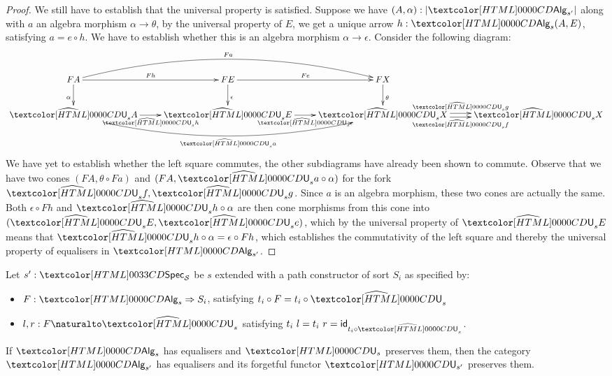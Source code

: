 \begin{proof}
  We still have to establish that the universal property is
  satisfied. Suppose we have $(A, \alpha) : | \Alg_{s'} |$ along with
  $a$ an algebra morphism $\alpha \to \theta$, by the universal
  property of $E$, we get a unique arrow $h : \Alg_s(A,E)$, satisfying
  $a = e \circ h$. We have to establish whether this is an algebra
  morphism $\alpha \to \epsilon$. Consider the following diagram:
  $$
  \xymatrix{
    FA
    \ar[r]^{Fh}
    \ar[d]_{\alpha}
    \ar@/^2pc/[rr]^{Fa}
    &FE 
    \ar[r]^{Fe}
    \ar[d]^{\epsilon}
    &FX
    \ar[d]^{\theta}
    \\
    \extendfunc{\Und}_s A
    \ar[r]_{\extendfunc{\Und}_s h}
    \ar@/_2pc/[rr]_{\extendfunc{\Und}_s a}
    &\extendfunc{\Und}_s E
    \ar[r]_{\extendfunc{\Und}_s e}
    &\extendfunc{\Und}_s X
    \ar@<-.5ex>[r]_-{\extendfunc{\Und}_s f} \ar@<.5ex>[r]^-{\extendfunc{\Und}_s g}
    &\extendfunc{\Und}_s X
  }
  $$
  We have yet to establish whether the left square commutes, the other
  subdiagrams have already been shown to commute. Observe that we have
  two cones $(FA, \theta \circ Fa)$ and $(FA, \extendfunc{\Und}_s a \circ \alpha)$ for
  the fork $\extendfunc{\Und}_s f, \extendfunc{\Und}_s g$. Since $a$ is an algebra morphism, these two cones
  are actually the same. Both $\epsilon \circ Fh$ and
  $\extendfunc{\Und}_s h \circ \alpha$ are then cone morphisms from this cone into
  $(\extendfunc{\Und}_s E,\extendfunc{\Und}_s e)$, which by the universal property of $\extendfunc{\Und}_s E$ means that
  $\extendfunc{\Und}_s h \circ \alpha = \epsilon \circ Fh$, which establishes the
  commutativity of the left square and thereby the universal property
  of equalisers in $\Alg_{s'}$.
\end{proof}

\begin{lemma}
  Let $s' : \specty_\Ss$ be $s$ extended with a path constructor of sort
  $S_i$ as specified by:
  \begin{itemize}
  \item $F : \Func{\Alg_s}{S_i}$, satisfying $t_i \circ F = t_i \circ \extendfunc{\Und}_s$
  \item $l, r : \Nat{F}{\extendfunc{\Und}_s}$ satisfying
    $t_i\ l = t_i\ r = \id_{t_i \circ \extendfunc{\Und}_s}$.
  \end{itemize}

  If $\Alg_s$ has equalisers and $\Und_s$ preserves them, then the category
  $\Alg_{s'}$ has equalisers and its forgetful functor $\Und_{s'}$
  preserves them.
\end{lemma}

